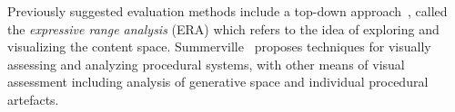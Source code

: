 Previously suggested evaluation methods include a top-down approach~\cite{p9Smith:2010:Expressive-range,Horn2014-comparativePCG}, called the \emph{expressive range analysis} (ERA) which refers to the idea of exploring and visualizing the content space. %
Summerville~\cite{p9summerville2018expanding} proposes %
techniques for visually assessing and analyzing procedural systems, with other means of visual assessment 
including analysis of generative space and individual procedural artefacts. %
